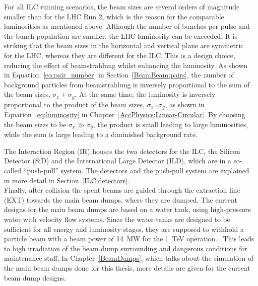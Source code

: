 For all ILC running scenarios, the beam sizes are several orders of magnitude smaller than for the LHC Run 2, which is the reason for the comparable luminosities as mentioned above.
Although the number of bunches per pulse and the bunch population are smaller, the LHC luminosity can be exceeded.
It is striking that the beam sizes in the horizontal and vertical plane are symmetric for the LHC, whereas they are different for the ILC.
This is a design choice, reducing the effect of beamstrahlung whilst enhancing the luminosity.
As shown in Equation~\ref{eq:pair_number} in Section~\ref{BeamBeam:pairs}, the number of background particles from beamstrahlung is inversely proportional to the sum of the beam sizes, $\sigma_x+\sigma_y$.
At the same time, the luminosity is inversely proportional to the product of the beam sizes, $\sigma_x\cdot\sigma_y$, as shown in Equation~\ref{eq:luminosity} in Chapter~\ref{AccPhysics:Linear-Circular}.
By choosing the beam sizes to be $\sigma_x\gg\sigma_y$, the product is small leading to large luminosities, while the sum is large leading to a diminished background rate.

The Interaction Region (IR) houses the two detectors for the ILC, the Silicon Detector (SiD) and the International Large Detector (ILD), which are in a so-called ``push-pull'' system.
The detectors and the push-pull system are explained in more detail in Section~\ref{ILC:detectors}.\\
Finally, after collision the spent beams are guided through the extraction line (EXT) towards the main beam dumps, where they are dumped.
The current designs for the main beam dumps are based on a water tank, using high-pressure water with velocity flow systems.
Since the water tanks are designed to be sufficient for all energy and luminosity stages, they are supposed to withhold a particle beam with a beam power of \SI{14}{\mega\watt} for the \SI{1}{\TeV} operation.~\cite[p. 18]{TDR32}
This leads to high irradiation of the beam dump surrounding and dangerous conditions for maintenance staff.
In Chapter~\ref{BeamDumps}, which talks about the simulation of the main beam dumps done for this thesis, more details are given for the current beam dump designs.

